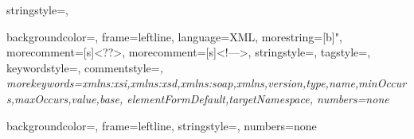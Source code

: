    {
    stringstyle=\color{black},
  }
  
   {
    backgroundcolor=\color{white},
    frame=leftline,
    language=XML,
    morestring=[b]",
    morecomment=[s]{<?}{?>},
    morecomment=[s]{<!--}{-->},
    stringstyle=\color{black},
    tagstyle=\color{Purple},
    keywordstyle=\color{MediumBlue},
    commentstyle=\color{gray}\slshape,
    morekeywords={xmlns:xsi,xmlns:xsd,xmlns:soap,xmlns,version,type,name,minOccurs,maxOccurs,value,base,
      elementFormDefault,targetNamespace},%
      numbers=none
    }
    
     {
      backgroundcolor=\color{white},
      frame=leftline,
      stringstyle=\color{black},
      numbers=none
    }




\providecommand{\marginline}[1]{\marginpar[\RaggedLeft{#1}]{\RaggedRight #1}}
\newcommand*{\TODO}[1]{\marginline{\scriptsize\textcolor{red}{TODO: #1}}}


\usepackage{scrpage2}


\setcounter{tocdepth}{2} %

\pagestyle{scrheadings} 




\renewcommand*{\chapterpagestyle}{scrheadings}


\let\OldTexttt\texttt
\renewcommand{\texttt}[1]{\OldTexttt{{#1}}\index{#1}}
\let\OldEmph\emph
\renewcommand{\emph}[1]{\OldEmph{{#1}}\index{#1}}



\usepackage[
breaklinks=true,
linktocpage=true,
hyperfootnotes=true,
plainpages=false,
pageanchor=true,
bookmarks=true,
colorlinks=false,
linkcolor=blue,
urlcolor=blue,
citecolor=blue,
bookmarks=true,
bookmarksnumbered=true,
pdfpagemode=UseOutlines,
pdfpagelabels=true,
pdfencoding=auto,
pdfstartview={FitH},
unicode
]{hyperref}
% 

\usepackage{cleveref}

